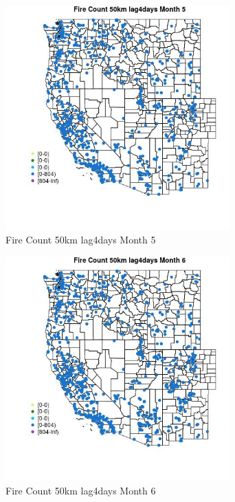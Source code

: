 \begin{figure} 
\centering  
\includegraphics[width=0.77\textwidth]{Code_Outputs/Report_ML_input_PM25_Step4_part_f_de_duplicated_aveswNAs_MapObsMo5Fire_Count_50km_lag4days.jpg} 
\caption{\label{fig:Report_ML_input_PM25_Step4_part_f_de_duplicated_aveswNAsMapObsMo5Fire_Count_50km_lag4days}Fire Count 50km lag4days Month 5} 
\end{figure} 
 

\begin{figure} 
\centering  
\includegraphics[width=0.77\textwidth]{Code_Outputs/Report_ML_input_PM25_Step4_part_f_de_duplicated_aveswNAs_MapObsMo6Fire_Count_50km_lag4days.jpg} 
\caption{\label{fig:Report_ML_input_PM25_Step4_part_f_de_duplicated_aveswNAsMapObsMo6Fire_Count_50km_lag4days}Fire Count 50km lag4days Month 6} 
\end{figure} 
 

